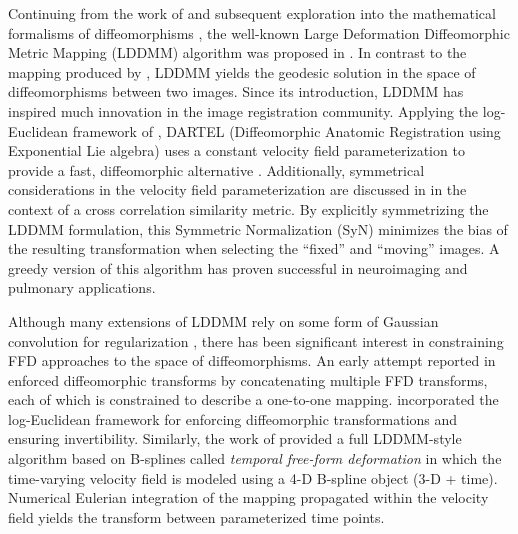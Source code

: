 \documentclass{frontiersSCNS}
\begin{document}
Continuing from the work of \cite{christensen1996} and subsequent exploration into the mathematical formalisms of diffeomorphisms \citep[e.g.][]{dupuis1998},
the well-known Large Deformation Diffeomorphic Metric Mapping (LDDMM) algorithm
was proposed in \cite{beg2005}.  In contrast to the mapping produced
by \cite{christensen1996}, LDDMM yields the geodesic solution in the space of diffeomorphisms between two images. Since its introduction, LDDMM has
inspired much innovation in the image registration community.  Applying
the log-Euclidean framework of \cite{arsigny2006}, DARTEL (Diffeomorphic Anatomic Registration using Exponential Lie algebra) uses a constant velocity field parameterization to provide a fast, diffeomorphic alternative \citep{ashburner2007}. Additionally, symmetrical considerations in the velocity field parameterization are discussed in \cite{avants2008} in the context of a cross correlation similarity metric.
By explicitly symmetrizing the LDDMM formulation, this Symmetric Normalization (SyN) minimizes the bias of the resulting transformation when selecting the ``fixed'' and ``moving'' images.  A greedy version of this algorithm has proven successful in neuroimaging \citep{klein2009} and pulmonary \citep{murphy2011} applications.





Although many extensions of LDDMM rely
on some form of Gaussian convolution for
regularization \citep[e.g.][]{risser2011}, there has been significant interest in constraining
FFD approaches to the space of diffeomorphisms.
An early attempt reported in \cite{rueckert2006} enforced
diffeomorphic transforms
by concatenating multiple FFD transforms, each of which is constrained
to describe a one-to-one mapping.
\cite{modat2011} incorporated the log-Euclidean
framework for enforcing diffeomorphic transformations and ensuring invertibility.  Similarly, the work of \cite{de-craene2011} provided
a full LDDMM-style algorithm based on B-splines called
{\it temporal free-form deformation} in which the
time-varying velocity field
is modeled using a 4-D B-spline object (3-D + time).  Numerical Eulerian integration of the mapping propagated within the velocity field yields the transform between parameterized time points.
\end{document}
